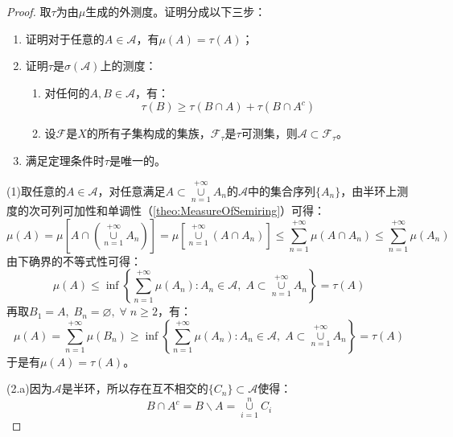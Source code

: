 \begin{proof}
	取$\tau$为由$\mu$生成的外测度。证明分成以下三步：
	\begin{enumerate}
		\item 证明对于任意的$A\in \mathscr{A}$，有$\mu(A)=\tau(A)$；
		\item 证明$\tau$是$\sigma(\mathscr{A})$上的测度：
		\begin{enumerate}
			\item 对任何的$A,B\in \mathscr{A}$，有：
			\begin{equation*}
				\tau(B)\geqslant\tau(B\cap A)+\tau(B\cap A^c)
			\end{equation*}
			\item 设$\mathscr{F}$是$X$的所有子集构成的集族，$\mathscr{F}_{\tau}$是$\tau$可测集，则$\mathscr{A}\subset \mathscr{F}_{\tau}$。
		\end{enumerate}
		\item 满足定理条件时$\tau$是唯一的。
	\end{enumerate}\par
	(1)取任意的$A\in \mathscr{A}$，对任意满足$A\subset\underset{n=1}{\overset{+\infty}{\cup}}A_n$的$\mathscr{A}$中的集合序列$\{A_n\}$，由半环上测度的次可列可加性和单调性（\cref{theo:MeasureOfSemiring}）可得：
	\begin{equation*}
		\mu(A)=\mu\left[A\cap\left(\underset{n=1}{\overset{+\infty}{\cup}}A_n\right)\right]=\mu\left[\underset{n=1}{\overset{+\infty}{\cup}}(A\cap A_n)\right]\leqslant\sum_{n=1}^{+\infty}\mu(A\cap A_n)\leqslant\sum_{n=1}^{+\infty}\mu(A_n)
	\end{equation*}
	由下确界的不等式性可得：
	\begin{equation*}
		\mu(A)\leqslant\inf\left\{\sum_{n=1}^{+\infty}\mu(A_n):A_n\in\mathscr{A},\;A\subset\underset{n=1}{\overset{+\infty}{\cup}}A_n\right\}=\tau(A)
	\end{equation*}
	再取$B_1=A,\;B_n=\varnothing,\;\forall\;n\geqslant2$，有：
	\begin{equation*}
		\mu(A)=\sum_{n=1}^{+\infty}\mu(B_n)\geqslant\inf\left\{\sum_{n=1}^{+\infty}\mu(A_n):A_n\in\mathscr{A},\;A\subset\underset{n=1}{\overset{+\infty}{\cup}}A_n\right\}=\tau(A)
	\end{equation*}
	于是有$\mu(A)=\tau(A)$。\par
	(2.a)因为$\mathscr{A}$是半环，所以存在互不相交的$\{C_n\}\subset\mathscr{A}$使得：
	\begin{equation*}
		B\cap A^c=B\backslash A=\underset{i=1}{\overset{n}{\cup}}C_i
	\end{equation*}

\end{proof}
